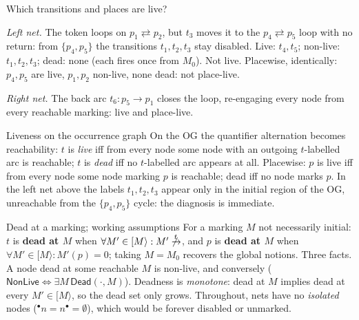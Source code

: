 \begin{examplebox}{Which transitions and places are live?}
\begin{center}
\end{center}
\emph{Left net.} The token loops on $p_1 \rightleftarrows p_2$, but $t_3$ moves it to the $p_4 \rightleftarrows p_5$ loop with no return: from $\{p_4, p_5\}$ the transitions $t_1, t_2, t_3$ stay disabled. Live: $t_4, t_5$; non-live: $t_1, t_2, t_3$; dead: none (each fires once from $M_0$). Not live. Placewise, identically: $p_4, p_5$ are live, $p_1, p_2$ non-live, none dead: not place-live.
\par\smallskip
\emph{Right net.} The back arc $t_6 : p_5 \to p_1$ closes the loop, re-engaging every node from every reachable marking: live and place-live.
\end{examplebox}

\begin{notebox}{Liveness on the occurrence graph}
On the OG the quantifier alternation becomes reachability: $t$ is \emph{live} iff from every node some node with an outgoing $t$-labelled arc is reachable; $t$ is \emph{dead} iff no $t$-labelled arc appears at all. Placewise: $p$ is live iff from every node some node marking $p$ is reachable; dead iff no node marks $p$. In the left net above the labels $t_1, t_2, t_3$ appear only in the initial region of the OG, unreachable from the $\{p_4, p_5\}$ cycle: the diagnosis is immediate.
\end{notebox}

\begin{definitionbox}{Dead at a marking; working assumptions}
For a marking $M$ not necessarily initial: $t$ is \textbf{dead at $M$} when $\forall M' \in [M\rangle : M' \not\xrightarrow{t}$, and $p$ is \textbf{dead at $M$} when $\forall M' \in [M\rangle : M'(p) = 0$; taking $M = M_0$ recovers the global notions. Three facts. A node dead at some reachable $M$ is non-live, and conversely ($\mathsf{NonLive} \Leftrightarrow \exists M\, \mathsf{Dead}(\cdot, M)$). Deadness is \emph{monotone}: dead at $M$ implies dead at every $M' \in [M\rangle$, so the dead set only grows. Throughout, nets have no \emph{isolated} nodes (${}^\bullet n = n^\bullet = \emptyset$), which would be forever disabled or unmarked.
\end{definitionbox}

